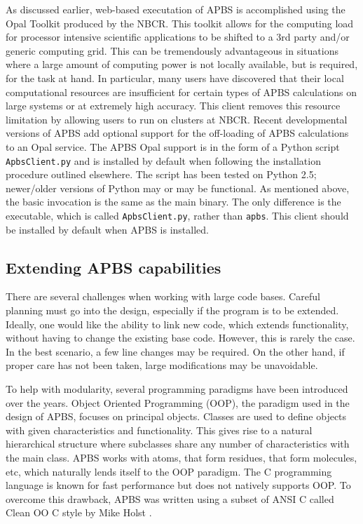 \documentclass[journal=jpcbfk, manuscript=article]{achemso}
\begin{document}
As discussed earlier, web-based executation of APBS is accomplished using the Opal Toolkit produced by the NBCR. This toolkit allows for the computing load for processor intensive scientific applications to be shifted to a 3rd party and/or generic computing grid. This can be tremendously advantageous in situations where a large amount of computing power is not locally available, but is required, for the task at hand. In particular, many users have discovered that their local computational resources are insufficient for certain types of APBS calculations on large systems or at extremely high accuracy. This client removes this resource limitation by allowing users to run on clusters at NBCR. Recent developmental versions of APBS add optional support for the off-loading of APBS calculations to an Opal service. 
The APBS Opal support is in the form of a Python script  \texttt{ApbsClient.py} and is installed by default when following the installation procedure outlined elsewhere. The script has been tested on Python 2.5; newer/older versions of Python may or may be functional. As mentioned above, the basic invocation is the same as the main binary. The only difference is the executable, which is called  \texttt{ApbsClient.py}, rather than  \texttt{apbs}. This client should be installed by default when APBS is installed. 

\subsection{Extending APBS capabilities}
There are several challenges when working with large code bases. Careful planning must go into the design, especially if the program is to be extended. Ideally, one would like the ability to link new code, which extends functionality, without having to change the existing base code. However, this is rarely the case. In the best scenario, a few line changes may be required. On the other hand, if proper care has not been taken, large modifications may be unavoidable.

To help with modularity, several programming paradigms have been introduced over the years. Object Oriented Programming (OOP), the paradigm used in the design of APBS, focuses on principal objects. Classes are used to define objects with given characteristics and functionality. This gives rise to a natural hierarchical structure where subclasses share any number of characteristics with the main class. APBS works with atoms, that form residues, that form molecules, etc, which naturally lends itself to the OOP paradigm. The C programming language is known for fast performance but does not natively supports OOP. To overcome this drawback, APBS was written using a subset of ANSI C called Clean OO C style by Mike Holst \cite{holst2001}. 
\end{document}
